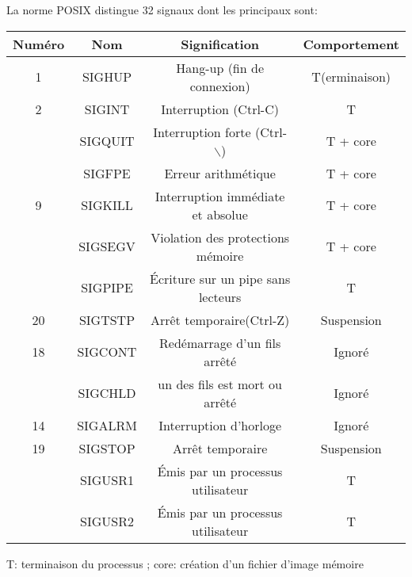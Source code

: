 \documentclass[9pt]{beamer}
\begin{document}
\begin{frame}
La norme POSIX distingue  32 signaux dont les principaux sont:
\begin{center}

\begin{tabular}{|c|c|c|c|}
    \hline 
    Numéro & Nom & Signification & Comportement\\ 
    \hline 
    1&SIGHUP & Hang-up (fin de connexion) & T(erminaison)\\ 
    \hline 
    2 &  SIGINT & Interruption (Ctrl-C)  &T\\ 
    \hline 
    &SIGQUIT & Interruption forte (Ctrl-$\backslash$) & T + core\\ 
    \hline 
    &SIGFPE & Erreur arithmétique & T + core\\ 
    \hline 
    9 &SIGKILL & Interruption immédiate et absolue & T + core\\ 
    \hline 
    &SIGSEGV&Violation des protections mémoire &T + core\\ 
    \hline 
    &SIGPIPE &Écriture sur un pipe sans lecteurs& T\\ 
    \hline 
    20 &SIGTSTP &Arrêt temporaire(Ctrl-Z)& Suspension\\ 
    \hline 
    18 &SIGCONT& Redémarrage d’un fils arrêté & Ignoré \\ 
    \hline 
    &SIGCHLD &un des fils est mort ou arrêté & Ignoré \\ 
    \hline 
    14 &SIGALRM & Interruption d’horloge & Ignoré \\ 
    \hline 
    19 &SIGSTOP & Arrêt temporaire & Suspension \\ 
    \hline 
    &SIGUSR1 & Émis par un processus utilisateur & T \\ 
    \hline 
    &SIGUSR2 & Émis par un processus utilisateur & T \\ 
    \hline 
\end{tabular} 
\end{center}
T: terminaison du processus
; core: création d'un fichier d'image mémoire
\end{frame}
\end{document}
